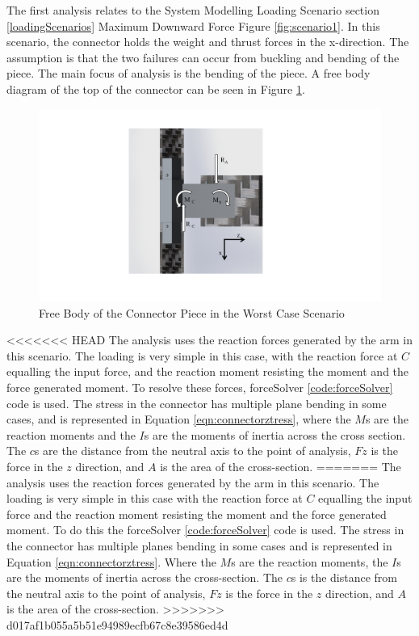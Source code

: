 \documentclass[../main.tex]{subfiles}
\begin{document}
The first analysis relates to the System Modelling Loading Scenario section \ref{loadingScenarios} Maximum Downward Force Figure \ref{fig:scenario1}. In this scenario, the connector holds the weight and thrust forces in the x-direction. The assumption is that the two failures can occur from buckling and bending of the piece. The main focus of analysis is the bending of the piece. A free body diagram of the top of the connector can be seen in Figure \ref{fig:armConnector}. 

\begin{figure}[H]
	\centering
	\includegraphics[page={1}, width=.7\linewidth]{img/analysis/arm/armConnector.pdf}
	\caption{Free Body of the Connector Piece in the Worst Case Scenario}
	\label{fig:armConnector}
\end{figure}

<<<<<<< HEAD
The analysis uses the reaction forces generated by the arm in this scenario. The loading is very simple in this case, with the reaction force at $C$ equalling the input force, and the reaction moment resisting the moment and the force generated moment. To resolve these forces, forceSolver \ref{code:forceSolver} code is used. The stress in the connector has multiple plane bending in some cases, and is represented in Equation \ref{eqn:connectorztress}, where the $M$s are the reaction moments and the $I$s are the moments of inertia across the cross section. The $c$s are the distance from the neutral axis to the point of analysis, $Fz$ is the force in the $z$ direction, and $A$ is the area of the cross-section.
=======
The analysis uses the reaction forces generated by the arm in this scenario. The loading is very simple in this case with the reaction force at $C$ equalling the input force and the reaction moment resisting the moment and the force generated moment. To do this the forceSolver \ref{code:forceSolver} code is used. The stress in the connector has multiple planes bending in some cases and is represented in Equation \ref{eqn:connectorztress}. Where the $M$s are the reaction moments, the $I$s are the moments of inertia across the cross-section. The $c$s is the distance from the neutral axis to the point of analysis, $Fz$ is the force in the $z$ direction, and $A$ is the area of the cross-section.
>>>>>>> d017af1b055a5b51e94989ecfb67c8e39586ed4d
\end{document}
